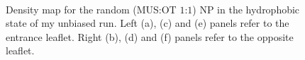 \begin{figure}[p]
{		}\\%
	\caption{Density map for the random (\acs{MUS}:\acs{OT} $1$:$1$) \acs{NP} in the hydrophobic state of my unbiased run. Left (a), (c) and (e) panels refer to the entrance leaflet. Right (b), (d) and (f) panels refer to the opposite leaflet.}%
	\label{fig:randomDensity}
\end{figure}

